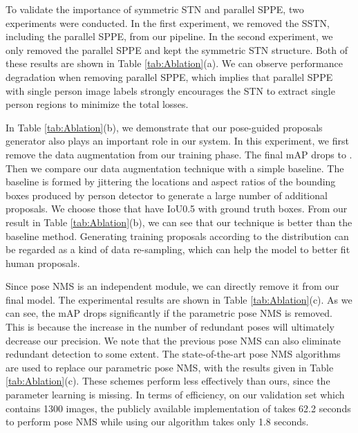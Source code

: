 \documentclass[10pt,twocolumn,letterpaper]{article}
\begin{document}
\vspace{1mm}
 To validate the importance of symmetric STN and parallel SPPE, two experiments were conducted. In the first experiment, we removed the SSTN, including the parallel SPPE, from our pipeline. In the second experiment, we only removed the parallel SPPE and kept the symmetric STN structure. Both of these results are shown in Table \ref{tab:Ablation}(a). We can observe performance degradation when removing parallel SPPE, which implies that parallel SPPE with single person image labels strongly encourages the STN to extract single person regions to minimize the total losses.

\vspace{1mm}
 In Table \ref{tab:Ablation}(b), we demonstrate that our pose-guided proposals generator also plays an important role in our system. In this experiment, we first remove the data augmentation from our training phase. The final mAP drops to . Then we compare our data augmentation technique with a simple baseline. The baseline is formed by jittering the locations and aspect ratios of the bounding boxes produced by person detector to generate a large number of additional proposals. We choose those that have IoU0.5 with ground truth boxes. From our result in Table \ref{tab:Ablation}(b), we can see that our technique is better than the baseline method. Generating training proposals according to the distribution can be regarded as a kind of data re-sampling, which can help the model to better fit human proposals.

\vspace{1mm}
 Since pose NMS is an independent module, we can directly remove it from our final model. The experimental results are shown in Table \ref{tab:Ablation}(c). As we can see, the mAP drops significantly if the parametric pose NMS is removed. This is because the increase in the number of redundant poses will ultimately decrease our precision. We note that the previous pose NMS can also eliminate redundant detection to some extent. The state-of-the-art pose NMS algorithms \cite{burgos2013merging,chen2015parsing} are used to replace our parametric pose NMS, with the results given in Table \ref{tab:Ablation}(c). These schemes perform less effectively than ours, since the parameter learning is missing. In terms of efficiency, on our validation set which contains 1300 images, the publicly available implementation of \cite{burgos2013merging}\footnotemark[3]takes 62.2 seconds to perform pose NMS while using our algorithm takes only 1.8 seconds.
\end{document}
